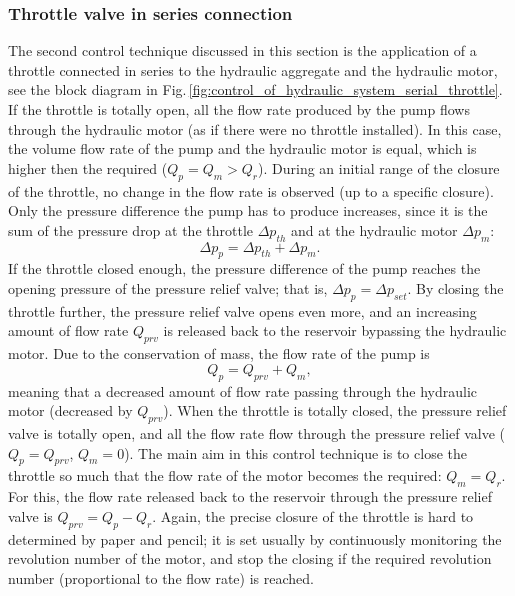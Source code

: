 \subsubsection{Throttle valve in series connection}
The second control technique discussed in this section is the application of a throttle connected in series to the hydraulic aggregate and the hydraulic motor, see the block diagram in Fig.\,\ref{fig:control_of_hydraulic_system_serial_throttle}. If the throttle is totally open, all the flow rate produced by the pump flows through the hydraulic motor (as if there were no throttle installed). In this case, the volume flow rate of the pump and the hydraulic motor is equal, which is higher then the required ($Q_p=Q_m>Q_r$). During an initial range of the closure of the throttle, no change in the flow rate is observed (up to a specific closure). Only the pressure difference the pump has to produce increases, since it is the sum of the pressure drop at the throttle $\Delta p_{th}$ and at the hydraulic motor $\Delta p_m$:
%
\begin{equation} \label{pressure_distrubution_in_serial_throttle}
\Delta p_p = \Delta p_{th} + \Delta p_m.
\end{equation}
%
If the throttle closed enough, the pressure difference of the pump reaches the opening pressure of the pressure relief valve; that is, $\Delta p_p=\Delta p_{set}$. By closing the throttle further, the pressure relief valve opens even more, and an increasing amount of flow rate $Q_{prv}$ is released back to the reservoir bypassing the hydraulic motor. Due to the conservation of mass, the flow rate of the pump is
%
\begin{equation}
Q_p = Q_{prv} + Q_m,
\end{equation}
%
meaning that a decreased amount of flow rate passing through the hydraulic motor (decreased by $Q_{prv}$). When the throttle is totally closed, the pressure relief valve is totally open, and all the flow rate flow through the pressure relief valve ($Q_p=Q_{prv}$, $Q_m=0$). The main aim in this control technique is to close the throttle so much that the flow rate of the motor becomes the required: $Q_m=Q_r$. For this, the flow rate released back to the reservoir through the pressure relief valve is $Q_{prv}=Q_p-Q_r$. Again, the precise closure of the throttle is hard to determined by paper and pencil; it is set usually by continuously monitoring the revolution number of the motor, and stop the closing if the required revolution number (proportional to the flow rate) is reached.

